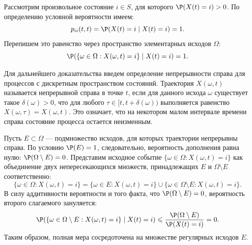 \begin{tproof}
    Рассмотрим произвольное состояние $i \in S$, для которого $\P(X(t) = i) > 0$. По определению условной вероятности имеем:
    \[
    p_{ii}(t, t) = \P(X(t) = i \mid X(t) = i) = 1.
    \]
    Перепишем это равенство через пространство элементарных исходов $\Omega$:
    \[
    \P(\{\omega \in \Omega : X(\omega, t) = i\} \mid X(t) = i) = 1.
    \]

    Для дальнейшего доказательства введем определение непрерывности справа для процессов с дискретным пространством состояний. Траектория $X(\omega, t)$ называется непрерывной справа в точке $t$, если для данного исхода $\omega$ существует такое $\delta(\omega) > 0$, что для любого $\tau \in [t, t + \delta(\omega))$ выполняется равенство $X(\omega, \tau) = X(\omega, t)$. Это означает, что на некотором малом интервале времени справа состояние процесса остается неизменным.

    Пусть $E \subset \Omega$ — подмножество исходов, для которых траектории непрерывны справа. По условию $\P(E) = 1$, следовательно, вероятность дополнения равна нулю: $\P(\Omega \setminus E) = 0$. Представим исходное событие $\{\omega \in \Omega : X(\omega, t) = i\}$ как объединение двух непересекающихся множеств, принадлежащих $E$ и $\Omega \setminus E$ соответственно:
    \[
    \{\omega \in \Omega : X(\omega, t) = i\} = \{\omega \in E : X(\omega, t) = i\} \cup \{\omega \in \Omega \setminus E : X(\omega, t) = i\}.
    \]
    В силу аддитивности вероятности и того факта, что $\P(\Omega \setminus E) = 0$, вероятность второго слагаемого зануляется:
    \[
    \P(\{\omega \in \Omega \setminus E : X(\omega, t) = i\} \mid X(t) = i) \leqslant \frac{\P(\Omega \setminus E)}{\P(X(t) = i)} = 0.
    \]
    Таким образом, полная мера сосредоточена на множестве регулярных исходов $E$.


\end{tproof}
